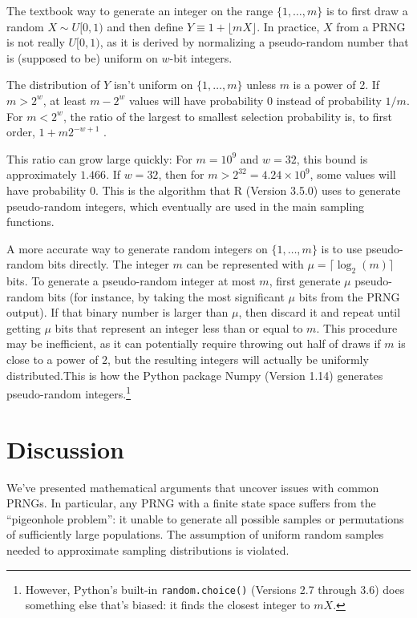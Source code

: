 \documentclass[graybox]{svmult}
\begin{document}
The textbook way to generate an integer on the range $\{1, \ldots, m\}$ is to first draw a random $X \sim U[0,1)$
and then define $Y \equiv 1 + \lfloor mX \rfloor$. 
In practice, $X$ from a PRNG is not really $U[0,1)$, as it is derived by normalizing a pseudo-random number that is
 (supposed to be) uniform on $w$-bit integers. 

The distribution of $Y$ isn't uniform on $\{1, \ldots, m\}$ unless $m$ is a power of 2.
If $m > 2^w$, at least $m-2^w$ values will have probability 0 instead of probability $1/m$.
For $m < 2^w$, the ratio of the largest to smallest selection probability is, to first order,  $1+ m 2^{-w+1}$ \cite{knuth_art_1997}.

This ratio can grow large quickly: For $m = 10^9$ and $w=32$, this bound is approximately $1.466$. 
If $w=32$, then for $m>2^{32}=4.24 \times 10^9$, some values will have probability 0. 
This is the algorithm that R (Version 3.5.0) \cite{R_2018} uses to generate pseudo-random integers,
which eventually are used in the main sampling functions.
    
A more accurate way to generate random integers on $\{1, \dots, m\}$ is to use pseudo-random bits directly. 
The integer $m$ can be represented with $\mu = \lceil \log_2(m) \rceil$ bits. 
To generate a pseudo-random integer at most $m$, first generate $\mu$ pseudo-random bits (for instance, by taking the most significant $\mu$ bits from the PRNG output).  
If that binary number is larger than $\mu$, then discard it and repeat until getting $\mu$ bits that represent an integer less than or equal to $m$.
This procedure may be inefficient, as it can potentially require throwing out half of draws if $m$ is close to a power of $2$, but the resulting integers will actually be uniformly distributed.This is how the Python package Numpy (Version 1.14) generates pseudo-random integers.\footnote{
However, Python's built-in \texttt{random.choice()} (Versions 2.7 through 3.6) does something else that's biased: it finds the closest integer to $mX$.
}


\section{Discussion}
\label{sec:discussion}

We've presented mathematical arguments that uncover issues with common PRNGs.
In particular, any PRNG with a finite state space suffers from the ``pigeonhole problem'':
it unable to generate all possible samples or permutations of sufficiently large populations.
The assumption of uniform random samples needed to approximate sampling distributions is violated.
\end{document}
